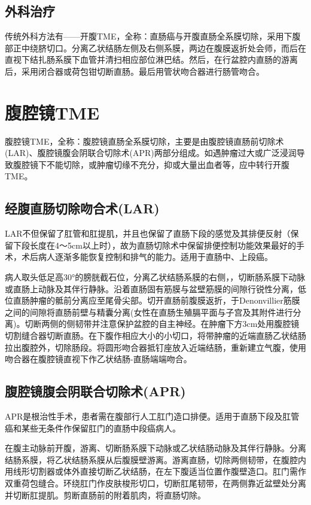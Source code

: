 \documentclass[a4paper,11pt,onecolumn,twoside]{article}
\begin{document}
\begin{multicols}{2}
    \subsection{外科治疗}
    传统外科方法有——开腹TME，全称：直肠癌与开腹直肠全系膜切除，采用下腹部正中绕脐切口。分离乙状结肠左侧及右侧系膜，两边在腹膜返折处会师，而后在直视下结扎肠系膜下血管并清扫相应部位淋巴结。然后，在行盆腔内直肠的游离后，采用闭合器或荷包钳切断直肠。最后用管状吻合器进行肠管吻合\supercite{1}。

    \section{腹腔镜TME}
    腹腔镜TME，全称：腹腔镜直肠全系膜切除，主要是由腹腔镜直肠前切除术(LAR)、腹腔镜腹会阴联合切除术(APR)\supercite{2}两部分组成。如遇肿瘤过大或广泛浸润导致腹腔镜下不能切除，或肿瘤切缘不充分，抑或大量出血者等，应中转行开腹TME。
    \subsection{经腹直肠切除吻合术(LAR)}
    LAR不但保留了肛管和肛提肌，并且也保留了直肠下段的感觉及其排便反射（保留下段长度在4～5cm以上时），故为直肠切除术中保留排便控制功能效果最好的手术，术后病人逐渐多能恢复控制和排气的能力。适用于直肠中、上段癌。

    病人取头低足高30°的膀胱截石位，分离乙状结肠系膜的右侧，，切断肠系膜下动脉或直肠上动脉及其伴行静脉。沿着直肠固有筋膜与盆壁筋膜的间隙行锐性分离，低位直肠肿瘤的骶前分离应至尾骨尖部。切开直肠前腹膜返折，于Denonvillier筋膜之间的间隙将直肠前壁与精囊分离(女性在直肠生殖膈平面与子宫及其附件进行分离)。切断两侧的侧韧带并注意保护盆腔的自主神经。在肿瘤下方3cm处用腹腔镜切割缝合器切断直肠。在下腹作相应大小的小切口，将带肿瘤的近端直肠乙状结肠拉出腹腔外，切除肠段。将圆形吻合器抵钉座放入近端结肠，重新建立气腹，使用吻合器在腹腔镜直视下作乙状结肠-直肠端端吻合。

    \subsection{腹腔镜腹会阴联合切除术(APR)}
    APR是根治性手术，患者需在腹部行人工肛门造口排便。适用于直肠下段及肛管癌和某些无条件作保留肛门的直肠中段癌病人\supercite{3}。

    在腹主动脉前开腹，游离、切断肠系膜下动脉或乙状结肠动脉及其伴行静脉。分离结肠系膜，将乙状结肠系膜从后腹膜壁游离。游离直肠，切除两侧韧带，在腹腔内用线形切割器或体外直接切断乙状结肠，在左下腹适当位置作腹壁造口。肛门需作双重荷包缝合。环绕肛门作皮肤梭形切口，切断肛尾韧带，在两侧靠近盆壁处分离并切断肛提肌。剪断直肠前的附着肌肉，将直肠切除。


\end{multicols}
\end{document}
